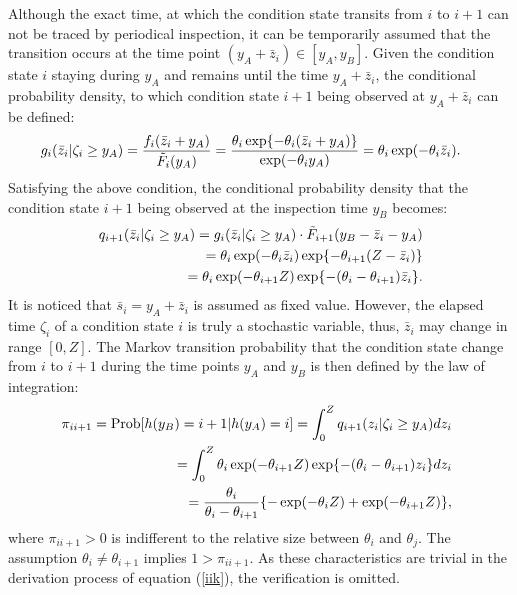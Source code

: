 Although the exact time, at which the condition state transits from $i$ to $i+1$ can not be traced by periodical inspection, it can be temporarily assumed that the transition occurs at the time point $(y_A+\bar{z}_i) \in [y_A,y_B]$. Given the condition state $i$ staying during $y_A$ and remains until the time $y_A+\bar{z}_i$, the conditional probability density, to which condition state $i+1$ being observed at $y_A+\bar{z}_i$ can be defined:
\begin{eqnarray}
&& \hspace{-8mm} g_i(\bar{z}_i|\zeta_i \geq y_A)=\frac{f_i(\bar{z}_i+y_A)}{\tilde{F}_i(y_A)} 
 =\frac{\theta_i \exp\{-\theta_i (\bar{z}_i+y_A)\}}{\exp(-\theta_i y_A)}
=\theta_i \exp(-\theta_i \bar{z}_i).
\end{eqnarray}
Satisfying the above condition, the conditional probability density that the condition state $i+1$ being observed at the inspection time $y_B$ becomes:
\begin{eqnarray}
&& \hspace{-3mm} q_{i+1}(\bar{z}_i|\zeta_i\geq y_A) 
 = g_i(\bar{z}_i|\zeta_i \geq y_A) \cdot \tilde{F}_{i+1}(y_B-\bar{z}_i-y_A) \nonumber\\
&& = \theta_i \exp(-\theta_i \bar{z}_i) \exp\{-\theta_{i+1}(Z-\bar{z}_i)\} \nonumber\\
&& = \theta_i \exp(-\theta_{i+1}Z)\exp\{-(\theta_i-\theta_{i+1})\bar{z}_i\}.
\end{eqnarray}
It is noticed that $\bar{s}_i=y_A+\bar{z}_i$ is assumed as fixed value. However, the elapsed time $\zeta_i$ of a condition state $i$ is truly a stochastic variable, thus,  $\bar{z}_i$ may change in range $[0, Z] $. The Markov transition probability that the condition state change from $i$ to $i+1$ during the time points $y_A$ and $y_B$ is then defined by the law of integration:
\begin{eqnarray}
&& \hspace{-5mm} \pi_{ii+1}=\mbox{Prob}[h(y_B)=i+1|h(y_A)=i] 
 =\int_{0}^{Z} q_{i+1}(z_i|\zeta_i\geq y_A)dz_i \nonumber \\
&& \hspace{-3mm} =\int_0^{Z} \theta_i \exp(-\theta_{i+1}Z)\exp\{-(\theta_i-\theta_{i+1})z_i\}dz_i \nonumber \\
&& \hspace{-3mm} = \frac{\theta_i}{\theta_{i}-\theta_{i+1}}\{-\exp(-\theta_{i}Z)+\exp(-\theta_{i+1}Z)\},\label{iik}
\end{eqnarray}
where $\pi_{ii+1}>0$ is indifferent to the relative size between $\theta_i$ and $\theta_j$. The assumption $\theta_i\neq \theta_{i+1}$ implies $1>\pi_{ii+1}$. As these characteristics are trivial in the derivation process of equation (\ref{iik}), the verification is omitted. 

